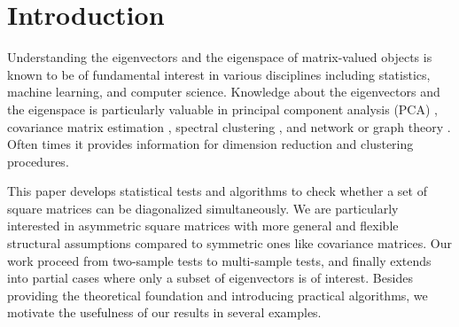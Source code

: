 \documentclass[12pt]{article}
\numberwithin{thm}{section}
\numberwithin{defn}{section}
\numberwithin{lem}{section}
\numberwithin{prop}{section}
\numberwithin{cor}{section}
\numberwithin{rem}{section}
\begin{document}
\section{Introduction}\label{sec:intro}
\vspace{-0.3cm}
Understanding the eigenvectors and the eigenspace of matrix-valued objects is known to be of fundamental interest in various disciplines including statistics, machine learning, and computer science.
Knowledge about the eigenvectors and the eigenspace is particularly valuable in principal component analysis (PCA) 
\citep{nadler2008finite,cai2013sparse,koltchinskii2017new}
, covariance matrix estimation \citep{fan2013large,fan2015estimation,fan2018eigenvector}, spectral clustering \citep{von2007tutorial,rohe2011spectral,lei2015}, and network or graph theory \citep{tang2018,paul2020spectral}.
Often times it provides information for dimension reduction and clustering procedures.

This paper develops statistical tests and algorithms to check whether a set of square matrices can be diagonalized simultaneously. We are particularly interested in asymmetric square matrices with more general and flexible structural assumptions compared to symmetric ones like covariance matrices. Our work proceed from two-sample tests to multi-sample tests, and finally extends into partial cases where only a subset of eigenvectors is of interest.
Besides providing the theoretical foundation and introducing practical algorithms, we motivate the usefulness of our results in several examples.
\end{document}
